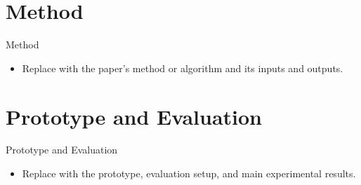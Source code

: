 \documentclass[aspectratio=169]{beamer}
\begin{document}
\section{Method}

\begin{frame}{Method}
  \begin{itemize}
    \item Replace with the paper's method or algorithm and its inputs and outputs.
  \end{itemize}
\end{frame}

\section{Prototype and Evaluation}

\begin{frame}{Prototype and Evaluation}
  \begin{itemize}
    \item Replace with the prototype, evaluation setup, and main experimental results.
  \end{itemize}
\end{frame}

\end{document}
